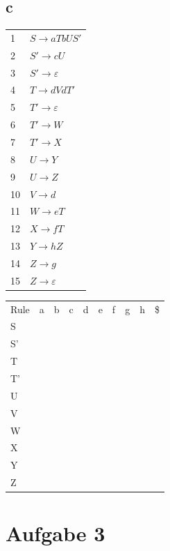 \documentclass[11pt]{scrartcl}
\begin{document}
	\subsection*{c}
	\begin{tabular}{l|l}
		1 & $S \rightarrow aTbUS'$  \\
		2 & $S' \rightarrow cU$ \\
		3 & $S' \rightarrow \varepsilon $\\
		4 & $T \rightarrow dVdT'$ \\
		5 & $T' \rightarrow \varepsilon$\\
		6 & $T' \rightarrow W $\\
		7 & $T' \rightarrow X$ \\
		8 & $U \rightarrow Y$\\
		9 & $U \rightarrow Z$\\
		10 & $V \rightarrow d$ \\
		11 & $W \rightarrow eT$ \\
		12 & $X \rightarrow fT$ \\
		13 & $Y \rightarrow hZ$ \\
		14 & $Z \rightarrow g$ \\
		15 & $Z \rightarrow \varepsilon$ \\
	\end{tabular}
	
	\begin{tabular}{l|l|l|l|l|l|l|l|l|l}
		Rule & a & b & c & d & e & f & g & h & \$ \\
		S \\
		S'\\
		T \\
		T' \\
		U \\
		V \\
		W \\
		X \\
		Y \\
		Z \\
	\end{tabular}
	\section*{Aufgabe 3}
\end{document}
